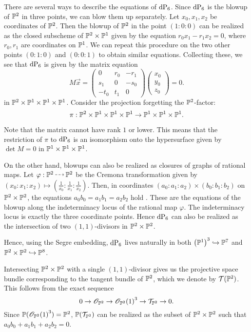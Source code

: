 There are several ways to describe the equations of $\dP6$. Since $\dP6$ is the blowup of $\P^2$ in three points, we can blow them up separately. Let $x_0,x_1,x_2$ be coordinates of $\P^2$. Then the blowup of $\P^2$ in the point $(1:0:0)$ can be realized as the closed subscheme of $\P^2 \times \P^1$ given by the equation $r_0x_1-r_1x_2=0$, where $r_0,r_1$ are coordinates on $\P^1$. We can repeat this procedure on the two other points $(0:1:0)$ and $(0:0:1)$ to obtain similar equations. Collecting these, we see that $\dP6$ is given by the matrix equation
\[
M\vec x = 
\begin{pmatrix}
0 & r_0 & -r_1 \\
s_1 & 0 & -s_0 \\
-t_0 & t_1 & 0
\end{pmatrix}
\begin{pmatrix}
x_0 \\ y_0 \\ z_0
\end{pmatrix}= 0.
\]
in $\P^2 \times \P^1 \times \P^1 \times \P^1$. Consider the projection forgetting the $\P^2$-factor:
$$
\pi:\P^2 \times \P^1 \times \P^1 \times \P^1 \to \P^1 \times \P^1 \times \P^1.
$$

 Note that the matrix cannot have rank $1$ or lower.  This means that the restriction of $\pi$ to $\dP6$ is an isomorphism onto the hypersurface given by $\det M=0$ in $\P^1 \times \P^1 \times \P^1$.

On the other hand, blowups can also be realized as closures of graphs of rational maps. Let $\varphi: \P^2 \rmap \P^2$ be the Cremona transformation given by $(x_0:x_1:x_2) \mapsto \left( \frac 1{x_0}: \frac 1{x_1}:\frac 1{x_2} \right)$. Then, in coordinates $(a_0:a_1:a_2) \times(b_0:b_1:b_2)$ on $\P^2 \times \P^2$, the equations $a_0b_0=a_1b_1=a_2b_2$ hold \label{eq:dp6_inp2p2}. These are the equations of the blowup along the indeterminacy locus of the rational map $\varphi$. The indeterminacy locus is exactly the three coordinate points. Hence $\dP6$ can also be realized as the intersection of two $(1,1)$-divisors in $\P^2 \times \P^2$. 

Hence, using the Segre embedding, $\dP6$ lives naturally in both ${\left( \P^1 \right)}^3 \hookrightarrow \P^7$ and $\P^2 \times \P^2 \hookrightarrow \P^8$. 

\begin{remark}
Intersecting $\P^2 \times \P^2$ with a single $(1,1)$-divisor gives us the projective space bundle corresponding to the tangent bundle of $\P^2$, which we denote by $\mathcal T(\P^2)$. This follows from the exact sequence
\[
0 \to \OO_{\P^2} \to {\OO_{\P^2}(1)}^3 \to \mathcal T_{\P^2} \to 0.
\]
Since $\P({\OO_{\P^2}(1)}^3)=\P^2$,  $\P(\mathcal T_{\P^2})$ can be realized as the subset of $\P^2 \times \P^2$ such that $a_0b_0+a_1b_1+a_2b_2=0$.
\end{remark}


